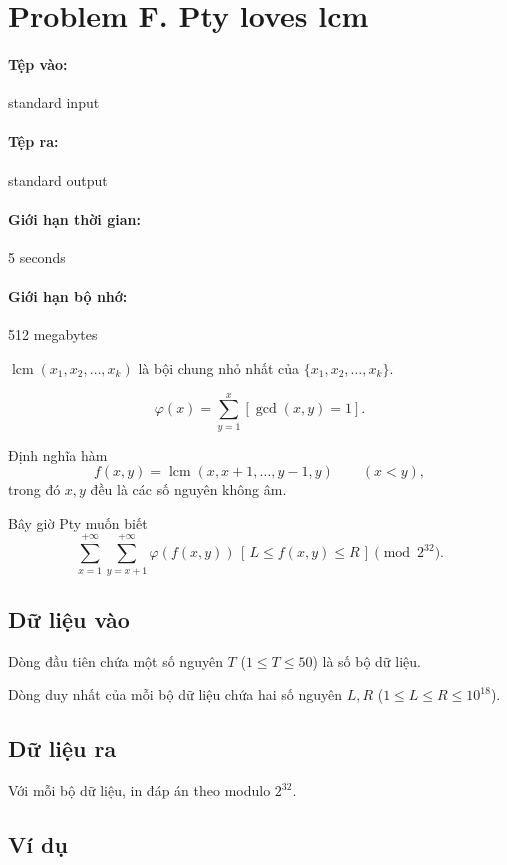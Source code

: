 \documentclass[11pt]{article}
\begin{document}
\section{Problem F. Pty loves lcm}

\paragraph{Tệp vào:} standard input
\paragraph{Tệp ra:} standard output
\paragraph{Giới hạn thời gian:} 5 seconds
\paragraph{Giới hạn bộ nhớ:} 512 megabytes

\(\operatorname{lcm}(x_1,x_2,\ldots,x_k)\) là bội chung nhỏ nhất của
\(\{x_1,x_2,\ldots,x_k\}\).

\[
  \varphi(x)=\sum_{y=1}^{x}[\gcd(x,y)=1].
\]

Định nghĩa hàm
\[
  f(x,y)=\operatorname{lcm}(x,x+1,\ldots,y-1,y)
  \qquad (x<y),
\]
trong đó \(x,y\) đều là các số nguyên không âm.

Bây giờ Pty muốn biết
\[
  \sum_{x=1}^{+\infty}\sum_{y=x+1}^{+\infty}
  \varphi(f(x,y))\,[\,L\le f(x,y)\le R\,]
  \pmod {2^{32}}.
\]

\subsection*{Dữ liệu vào}

Dòng đầu tiên chứa một số nguyên \(T\) (\(1\le T\le 50\)) là số bộ dữ liệu.

Dòng duy nhất của mỗi bộ dữ liệu chứa hai số nguyên \(L,R\)
(\(1\le L\le R\le 10^{18}\)).

\subsection*{Dữ liệu ra}

Với mỗi bộ dữ liệu, in đáp án theo modulo \(2^{32}\).

\subsection*{Ví dụ}
\end{document}
